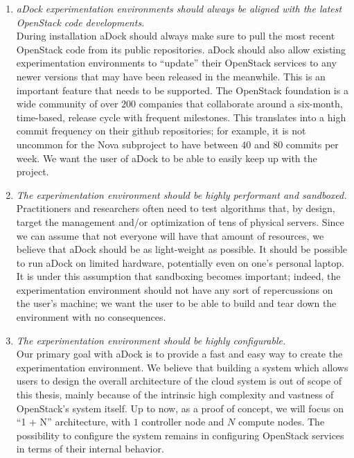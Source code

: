\begin{enumerate}
	\item \emph{aDock experimentation environments should always be aligned with the latest OpenStack code developments.} \hfill \\
	 During installation aDock should always make sure to pull the most recent OpenStack code from its public repositories. aDock should also allow existing experimentation environments to ``update'' their OpenStack services to any newer versions that may have been released in the meanwhile. This is an important feature that needs to be supported. The OpenStack foundation is a wide community of over $200$ companies that collaborate around a six-month, time-based, release cycle with frequent milestones. This translates into a high commit frequency on their github repositories; for example, it is not uncommon for the Nova subproject to have between $40$ and $80$ commits per week. We want the user of aDock to be able to easily keep up with the project.

	\item \emph{The experimentation environment should be highly performant and sandboxed.} \hfill \\
	 Practitioners and researchers often need to test algorithms that, by design, target the management and/or optimization of tens of physical servers. Since we can assume that not everyone will have that amount of resources, we believe that aDock should be as light-weight as possible. It should be possible to run aDock on limited hardware, potentially even on one's personal laptop. It is under this assumption that sandboxing becomes important; indeed, the experimentation environment should not have any sort of repercussions on the user's machine; we want the user to be able to build and tear down the environment with no consequences. 

	\item \emph{The experimentation environment should be highly configurable.} \hfill \\
	 Our primary goal with aDock is to provide a fast and easy way to create the experimentation environment. We believe that building a system which allows users to design the overall architecture of the cloud system is out of scope of this thesis, mainly because of the intrinsic high complexity and vastness of OpenStack's system itself. Up to now, as a proof of concept, we will focus on ``1 + N'' architecture, with $1$ controller node and $N$ compute nodes. The possibility to configure the system remains in configuring OpenStack services in terms of their internal behavior.
\end{enumerate}


